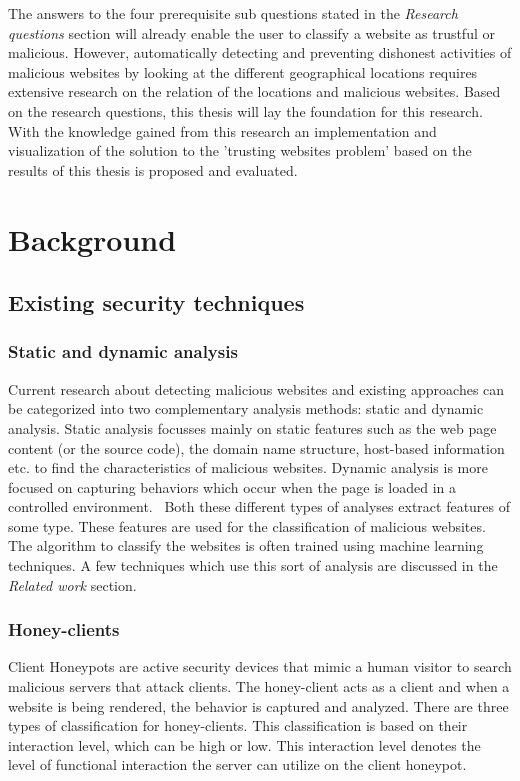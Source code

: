 \documentclass[twoside,openright,notitlepage]{uva-bachelor-thesis}
\begin{document}
The answers to the four prerequisite sub questions stated in the \emph{Research questions} section will already enable the user to classify a website as trustful or malicious. However, automatically detecting and preventing dishonest activities of malicious websites by looking at the different geographical locations requires extensive research on the relation of the locations and malicious websites. Based on the research questions, this thesis will lay the foundation for this research. With the knowledge gained from this research an implementation and visualization of the solution to the 'trusting websites problem' based on the results of this thesis is proposed and evaluated.

\chapter{Background}

\section{Existing security techniques}
\subsection{Static and dynamic analysis}
Current research about detecting malicious websites and existing approaches can be categorized into two complementary analysis methods: static and dynamic analysis. Static analysis focusses mainly on static features such as the web page content (or the source code), the domain name structure, host-based information etc. to find the characteristics of malicious websites. Dynamic analysis is more focused on capturing behaviors which occur when the page is loaded in a controlled environment.~\cite{eshete2011malicious} Both these different types of analyses extract features of some type. These features are used for the classification of malicious websites. The algorithm to classify the websites is often trained using machine learning techniques. A few techniques which use this sort of analysis are discussed in the \emph{Related work} section.

\subsection{Honey-clients}
Client Honeypots are active security devices that mimic a human visitor to search malicious servers that attack clients. The honey-client acts as a client and when a website is being rendered, the behavior is captured and analyzed. There are three types of classification for honey-clients. This classification is based on their interaction level, which can be high or low. This interaction level denotes the level of functional interaction the server can utilize on the client honeypot. 
\end{document}
